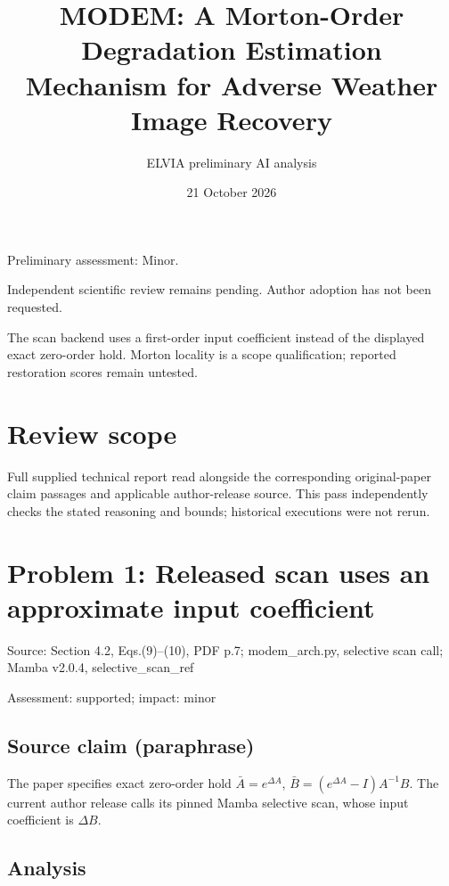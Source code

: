 \documentclass[11pt]{article}
\begin{document}
\title{MODEM: A Morton-Order Degradation Estimation Mechanism for Adverse Weather Image Recovery}

\author{ELVIA preliminary AI analysis}\date{21 October 2026}\maketitle

Preliminary assessment: Minor.\par

Independent scientific review remains pending. Author adoption has not been requested.

The scan backend uses a first-order input coefficient instead of the displayed exact zero-order hold. Morton locality is a scope qualification; reported restoration scores remain untested.

\section*{Review scope}

Full supplied technical report read alongside the corresponding original-paper claim passages and applicable author-release source. This pass independently checks the stated reasoning and bounds; historical executions were not rerun.

\section*{Problem 1: Released scan uses an approximate input coefficient}

Source: Section 4.2, Eqs.(9)–(10), PDF p.7; modem\_arch.py, selective scan call; Mamba v2.0.4, selective\_scan\_ref

Assessment: supported; impact: minor

\subsection*{Source claim (paraphrase)}

The paper specifies exact zero-order hold \(\bar A=e^{\Delta A}\), \(\bar B=(e^{\Delta A}-I)A^{-1}B\). The current author release calls its pinned Mamba selective scan, whose input coefficient is \(\Delta B\).

\subsection*{Analysis}
\end{document}
